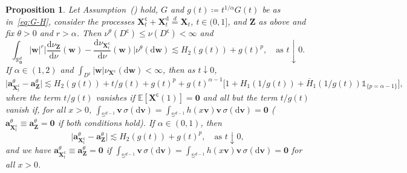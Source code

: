 \documentclass[en,oneside,bbfont,article]{amsart}
\newtheorem{proposition}[theorem]{Proposition}
\theoremstyle{remark}
\theoremstyle{definition}
\theoremstyle{definition}
\newcommand\Sp{\mathbb{S}}
\newcommand\R{\mathbb{R}}
\newcommand\E{\mathds{E}}
\newcommand\1{\mathds{1}}
\newcommand\da{\downarrow}
\renewcommand\le{\leqslant}
\newcommand\eqd{\overset{d}{=}}
\newcommand\co{\mathsf{c}}
\newcommand{\D}{\mathrm{d}}
\newcommand{\ov}[1]{\overline{#1}}
\begin{document}
\begin{proposition}
\label{prop:integrals_DoA_thin}
Let Assumption~() hold, $G$ and $g(t)\coloneqq t^{1/\alpha}G(t)$ be as in~\eqref{eq:G-H}, consider the processes $\bm{X}_t^\co+\bm{X}_t^\D\eqd\bm{X}_t$, $t\in(0,1]$, and $\bm{Z}$ as above and fix $\theta>0$ and $r>\alpha$. Then $\nu^\theta(D^\co)\le\nu(D^\co)<\infty$ and 
\begin{equation}
\label{eq:thin-w^r-dist-mu}
\int_{\R^d_{\bm 0}} |\bm{w}|^r\bigg|\frac{\D\nu_{\bm{Z}}}{\D\nu}(\bm{w})
    -\frac{\D\nu_{\bm{X}_t^\co}}{\D\nu}(\bm{w})\bigg| \nu^\theta(\D\bm{w})
\lesssim H_2(g(t)) + g(t)^p,
\quad\text{as }t\da 0.
\end{equation}
If $\alpha\in(1,2)$ and $\int_{D^\co} |\bm{w}|\nu_{\bm{X}^\co}(\D\bm{w})<\infty$, then as $t\da 0$,
\[
\big|\bm{a}_{\bm{X}^\co_t}^\theta-\bm{a}_{\bm{Z}}^\theta\big|
\lesssim
H_2(g(t)) + t/g(t) + g(t)^p 
+ g(t)^{\alpha-1} \big[1+H_1(1/g(t))
    +\ov{H}_1(1/g(t))\1_{\{p=\alpha-1\}}\big],
\]
where the term $t/g(t)$ vanishes if $\E[\bm{X}^\co(1)]=\bm{0}$ and all but the term $t/g(t)$ vanish if, for all $x>0$, $\int_{\Sp^{d-1}}\bm{v}\,\sigma(\D\bm{v})=\int_{\Sp^{d-1}}h(x\bm{v})\bm{v}\,\sigma(\D\bm{v})=\bm{0}$ ($\bm{a}^\theta_{\bm{X}^\co_t}\equiv \bm{a}^\theta_{\bm{Z}}=\bm{0}$ if both conditions hold). If $\alpha\in(0,1)$, then
\[
\big|\bm{a}_{\bm{X}^\co_t}^\theta-\bm{a}_{\bm{Z}}^\theta\big|
\lesssim H_2(g(t))+g(t)^p,
\quad\text{as }t\da 0,
\]
and we have $\bm{a}^\theta_{\bm{X}^\co_t}\equiv \bm{a}^\theta_{\bm{Z}}=\bm{0}$ if $\int_{\Sp^{d-1}}\bm{v}\,\sigma(\D\bm{v})=\int_{\Sp^{d-1}}h(x\bm{v})\bm{v}\,\sigma(\D\bm{v})=\bm{0}$ for all $x>0$.
\end{proposition}
\end{document}

